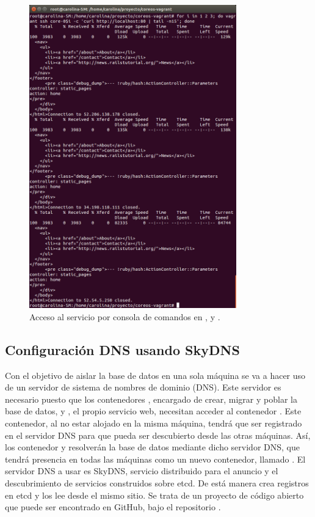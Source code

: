 \begin{figure}[H]
\centering
\includegraphics[width=0.8\textwidth]{images/figures/curl-fleet.png}
\caption{Acceso al servicio por consola de comandos en ,  y .}
\end{figure}

\subsection{Configuración DNS usando SkyDNS}

Con el objetivo de aislar la base de datos en una sola máquina se va a hacer uso de un servidor de sistema de nombres de dominio (DNS). Este servidor es necesario puesto que los contenedores , encargado de crear, migrar y poblar la base de datos, y , el propio servicio web, necesitan acceder al contenedor . Este contenedor, al no estar alojado en la misma máquina, tendrá que ser registrado en el servidor DNS para que pueda ser descubierto desde las otras máquinas. Así, los contenedor  y  resolverán la base de datos mediante dicho servidor DNS, que tendrá presencia en todas las máquinas como un nuevo contenedor, llamado . El servidor DNS a usar es SkyDNS, servicio distribuido para el anuncio y el descubrimiento de servicios construidos sobre etcd. De está manera crea registros en etcd y los lee desde el mismo sitio. Se trata de un proyecto de código abierto que puede ser encontrado en GitHub, bajo el repositorio .

